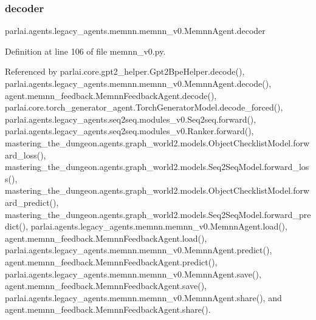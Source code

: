 \mbox{\label{classparlai_1_1agents_1_1legacy__agents_1_1memnn_1_1memnn__v0_1_1MemnnAgent_a0de6d8c7652909439a38f21616a7561c}} 
\subsubsection{\texorpdfstring{decoder}{decoder}}
{\footnotesize\ttfamily parlai.\+agents.\+legacy\+\_\+agents.\+memnn.\+memnn\+\_\+v0.\+Memnn\+Agent.\+decoder}



Definition at line 106 of file memnn\+\_\+v0.\+py.



Referenced by parlai.\+core.\+gpt2\+\_\+helper.\+Gpt2\+Bpe\+Helper.\+decode(), parlai.\+agents.\+legacy\+\_\+agents.\+memnn.\+memnn\+\_\+v0.\+Memnn\+Agent.\+decode(), agent.\+memnn\+\_\+feedback.\+Memnn\+Feedback\+Agent.\+decode(), parlai.\+core.\+torch\+\_\+generator\+\_\+agent.\+Torch\+Generator\+Model.\+decode\+\_\+forced(), parlai.\+agents.\+legacy\+\_\+agents.\+seq2seq.\+modules\+\_\+v0.\+Seq2seq.\+forward(), parlai.\+agents.\+legacy\+\_\+agents.\+seq2seq.\+modules\+\_\+v0.\+Ranker.\+forward(), mastering\+\_\+the\+\_\+dungeon.\+agents.\+graph\+\_\+world2.\+models.\+Object\+Checklist\+Model.\+forward\+\_\+loss(), mastering\+\_\+the\+\_\+dungeon.\+agents.\+graph\+\_\+world2.\+models.\+Seq2\+Seq\+Model.\+forward\+\_\+loss(), mastering\+\_\+the\+\_\+dungeon.\+agents.\+graph\+\_\+world2.\+models.\+Object\+Checklist\+Model.\+forward\+\_\+predict(), mastering\+\_\+the\+\_\+dungeon.\+agents.\+graph\+\_\+world2.\+models.\+Seq2\+Seq\+Model.\+forward\+\_\+predict(), parlai.\+agents.\+legacy\+\_\+agents.\+memnn.\+memnn\+\_\+v0.\+Memnn\+Agent.\+load(), agent.\+memnn\+\_\+feedback.\+Memnn\+Feedback\+Agent.\+load(), parlai.\+agents.\+legacy\+\_\+agents.\+memnn.\+memnn\+\_\+v0.\+Memnn\+Agent.\+predict(), agent.\+memnn\+\_\+feedback.\+Memnn\+Feedback\+Agent.\+predict(), parlai.\+agents.\+legacy\+\_\+agents.\+memnn.\+memnn\+\_\+v0.\+Memnn\+Agent.\+save(), agent.\+memnn\+\_\+feedback.\+Memnn\+Feedback\+Agent.\+save(), parlai.\+agents.\+legacy\+\_\+agents.\+memnn.\+memnn\+\_\+v0.\+Memnn\+Agent.\+share(), and agent.\+memnn\+\_\+feedback.\+Memnn\+Feedback\+Agent.\+share().


